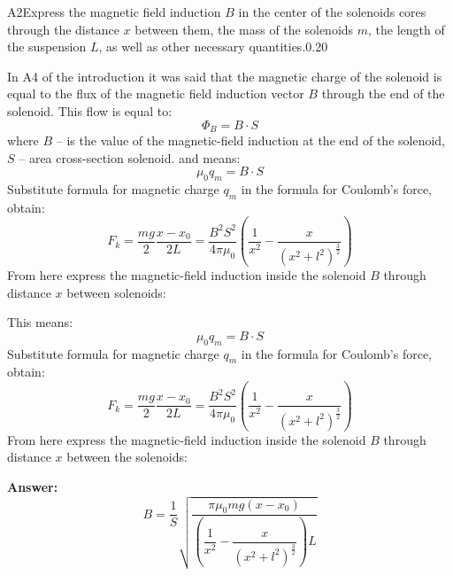 \documentclass[11pt,a4paper]{article}
\begin{document}
\begin{solcard}{A2}{Express the magnetic field induction $B$ in the center of the solenoids cores through the distance $x$ between them, the mass of the solenoids $m$, the length of the suspension $L$, as well as other necessary quantities.}{0.20}

In A4 of the introduction it was said that the magnetic charge of the solenoid is equal to the flux of the magnetic field induction vector $B$ through the end of the solenoid. This flow is equal to: $$\Phi_{B}=B \cdot S$$ where $B$ – is the value of the magnetic-field induction at the end of the solenoid, $S$ – area cross-section solenoid. and means: $$\mu_0q_{m}=B \cdot S$$ Substitute formula for magnetic charge $q_{m}$ in the formula for Coulomb's force, obtain: $$F_{k}=\frac{m g}{2} \frac{x-x_{0}}{2L}=\frac{B^2S^2}{4 \pi \mu_0}\left(\frac{1}{x^2}-\dfrac{x}{(x^2+l^2)^{\frac{3}{2}}}\right)$$ From here express the magnetic-field induction inside the solenoid $B$ through distance $x$ between solenoids:


This means: $$\mu_0q_{m}=B \cdot S$$ Substitute formula for magnetic charge $q_{m}$ in the formula for Coulomb's force, obtain: $$F_{k}=\frac{m g}{2} \frac{x-x_{0}}{2L}=\frac{B^2S^2}{4 \pi \mu_0}\left(\frac{1}{x^2}-\dfrac{x}{(x^2+l^2)^{\frac{3}{2}}}\right)$$ From here express the magnetic-field induction inside the solenoid $B$ through distance $x$ between the solenoids:

\par\smallskip\noindent\textbf{Answer:} $$B=\dfrac{ 1}{S} \sqrt{\dfrac{\pi \mu_{0} m g (x-x_{0})}{\left(\dfrac{1}{x^2}-\dfrac{x}{(x^2+l^2)^{\frac{3}{2}}}\right)L}}$$
\end{solcard}
\end{document}

